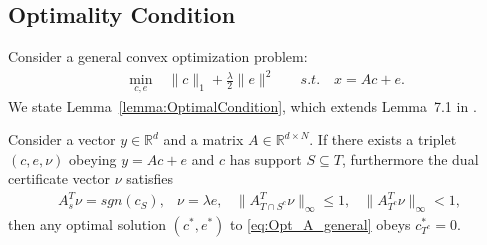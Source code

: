 \documentclass[twoside,11pt]{article}
\numberwithin{equation}{section}
\begin{document}
\subsection{Optimality Condition}\label{sec:optimality}
Consider a general convex optimization problem:
\begin{equation}\label{eq:Opt_A_general}
\begin{aligned}
\quad \min_{c, e} \; &\|c\|_1+\frac{\lambda}{2}\|e\|^2 \quad &s.t. \quad x=Ac+e.
\end{aligned}
\end{equation}
We state Lemma~\ref{lemma:OptimalCondition}, which extends Lemma~7.1 in \citet{soltanolkotabi2011geometric}.
\begin{lemma}\label{lemma:OptimalCondition}
Consider a vector $y\in \mathbb{R}^d$ and a matrix $A \in \mathbb{R}^{d\times N}$. If there exists a triplet $(c,e,\nu)$ obeying $y=Ac+e$ and $c$ has support $S\subseteq T$, furthermore the dual certificate vector $\nu$ satisfies
\begin{equation*}
\begin{array}{cccc}
  A_s^T\nu=sgn(c_S), & \nu=\lambda e,  &
  \|A^T_{T\cap S^{c}}\nu\|_{\infty} \leq 1, & \|A^T_{T^{c}}\nu\|_{\infty}<1,
\end{array}
\end{equation*}
then any optimal solution $(c^{*},e^{*})$  to \eqref{eq:Opt_A_general} obeys $c^{*}_{T^{c}}=0$.
\end{lemma}
\end{document}
